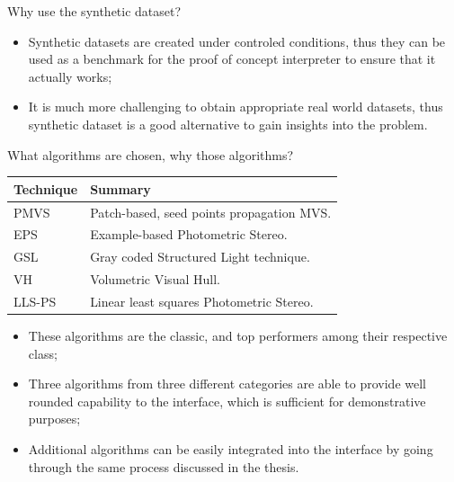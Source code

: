 \documentclass[10pt]{beamer}
\begin{document}
\begin{frame}

\begin{alertblock}{Why use the synthetic dataset?}
\begin{itemize}
\item Synthetic datasets are created under controled conditions, thus they can be used as a benchmark for the proof of concept interpreter to ensure that it actually works;
\item It is much more challenging to obtain appropriate real world datasets, thus synthetic dataset is a good alternative to gain insights into the problem.
\end{itemize}
\end{alertblock}

\end{frame}

\begin{frame}

\begin{alertblock}{What algorithms are chosen, why those algorithms?}

\begin{table}
\centering
\begin{tabular}{l|l}
\toprule
Technique & Summary\\
\midrule
PMVS & Patch-based, seed points propagation MVS.\\
EPS & Example-based Photometric Stereo.\\
GSL & Gray coded Structured Light technique.\\
\midrule
VH & Volumetric Visual Hull.\\
LLS-PS & Linear least squares Photometric Stereo.\\
\bottomrule
\end{tabular}
\end{table}

\begin{itemize}
\item These algorithms are the classic, and top performers among their respective class;
\item Three algorithms from three different categories are able to provide well rounded capability to the interface, which is sufficient for demonstrative purposes;
\item Additional algorithms can be easily integrated into the interface by going through the same process discussed in the thesis.
\end{itemize}
\end{alertblock}

\end{frame}
\end{document}

